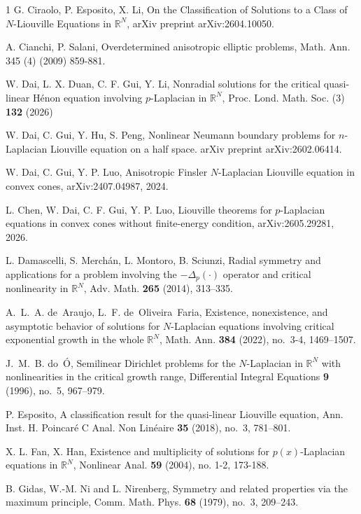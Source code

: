\documentclass[reqno, 11pt]{amsart} %
\numberwithin{equation}{section}
\theoremstyle{definition}
\begin{document}
\begin{thebibliography}{1}
      G. Ciraolo, P. Esposito, X. Li,
    On the Classification of Solutions to a Class of $N$-Liouville Equations in $\mathbb{R}^N$,  arXiv preprint  	arXiv:2604.10050.

    A. Cianchi, P. Salani, Overdetermined anisotropic elliptic problems, Math. Ann. 345 (4) (2009) 859-881.

     W. Dai, L. X. Duan, C. F. Gui, Y. Li, Nonradial solutions for the critical quasi-linear H\'{e}non equation involving $p$-Laplacian in $\mathbb{R}^N$, Proc. Lond. Math. Soc. (3) {\bf 132} (2026)

     W. Dai, C. Gui, Y. Hu, S. Peng, Nonlinear Neumann boundary problems for $ n $-Laplacian Liouville equation on a half space. arXiv preprint arXiv:2602.06414.

     W. Dai, C. Gui, Y. P. Luo, Anisotropic Finsler $N$-Laplacian Liouville equation in convex cones, arXiv:2407.04987, 2024.

     L. Chen, W. Dai, C. F. Gui, Y. P. Luo, Liouville theorems for $p$-Laplacian equations in convex cones without finite-energy condition, arXiv:2605.29281, 2026.

     L. Damascelli, S. Merch\'an, L. Montoro, B. Sciunzi, Radial symmetry and applications for a problem involving the $-\Delta_p(\cdot)$ operator and critical nonlinearity in $\mathbb{R}^N$, Adv. Math. {\bf 265} (2014), 313--335.

     A.~L.~A. de~Araujo, L.~F. de~Oliveira~Faria, Existence, nonexistence, and asymptotic behavior of solutions for $N$-Laplacian equations involving critical exponential growth in the whole $\mathbb R^N$, Math. Ann. {\bf 384} (2022), no.~3-4, 1469--1507.

      J.~M.~B. do~\'O, Semilinear Dirichlet problems for the $N$-Laplacian in $\mathbb{R}^N$ with nonlinearities in the critical growth range, Differential Integral Equations {\bf 9} (1996), no.~5, 967--979.

      P. Esposito, A classification result for the quasi-linear Liouville equation, Ann. Inst. H. Poincar\'e{} C Anal. Non Lin\'eaire {\bf 35} (2018), no.~3, 781--801.

      X. L. Fan, X. Han, Existence and multiplicity of solutions for $p(x)$-Laplacian equations in $\mathbb{R}^N$, Nonlinear Anal. {\bf 59} (2004), no. 1-2, 173-188.

    B. Gidas, W.-M. Ni and L. Nirenberg, Symmetry and related properties via the maximum principle, Comm. Math. Phys. {\bf 68} (1979), no.~3, 209--243.


\end{thebibliography}
\end{document}
